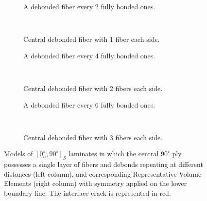 \documentclass[review]{elsarticle}
\begin{document}
\begin{figure}[!h]
\centering
    \begin{subfigure}[b]{0.45\textwidth}
        \caption{A debonded fiber every 2 fully bonded ones.}\label{subfig:every2}
    \end{subfigure} ~
    \begin{subfigure}[b]{0.45\textwidth}
        \caption{Central debonded fiber with 1 fiber each side.}\label{subfig:1eachside}
    \end{subfigure}

    \begin{subfigure}[b]{0.45\textwidth}
        \caption{A debonded fiber every 4 fully bonded ones.}\label{subfig:every4}
    \end{subfigure} ~
    \begin{subfigure}[b]{0.45\textwidth}
        \caption{Central debonded fiber with 2 fibers each side.}\label{subfig:2eachside}
    \end{subfigure}

    \begin{subfigure}[b]{0.45\textwidth}
        \caption{A debonded fiber every 6 fully bonded ones.}\label{subfig:every6}
    \end{subfigure} ~
    \begin{subfigure}[b]{0.45\textwidth}
        \caption{Central debonded fiber with 3 fibers each side.}\label{subfig:3eachside}
    \end{subfigure}
\caption{Models of $\left[0^{\circ}_{n}, 90^{\circ}\right]_{S}$ laminates in which the central $90^{\circ}$ ply possesses a single layer of fibers and debonds repeating at different distances (left column), and corresponding Representative Volume Elements (right column) with symmetry applied on the lower boundary line. The interface crack is represented in red.}\label{fig:fibersOnSideModels}
\end{figure}
\end{document}
